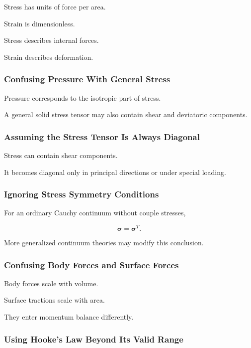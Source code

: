 Stress has units of force per area.

Strain is dimensionless.

Stress describes internal forces.

Strain describes deformation.

\subsubsection{Confusing Pressure With General Stress}

Pressure corresponds to the isotropic part of stress.

A general solid stress tensor may also contain shear and deviatoric
components.

\subsubsection{Assuming the Stress Tensor Is Always Diagonal}

Stress can contain shear components.

It becomes diagonal only in principal directions or under special loading.

\subsubsection{Ignoring Stress Symmetry Conditions}

For an ordinary Cauchy continuum without couple stresses,

\[
\boldsymbol{\sigma}
=
\boldsymbol{\sigma}^{T}.
\]

More generalized continuum theories may modify this conclusion.

\subsubsection{Confusing Body Forces and Surface Forces}

Body forces scale with volume.

Surface tractions scale with area.

They enter momentum balance differently.

\subsubsection{Using Hooke's Law Beyond Its Valid Range}

